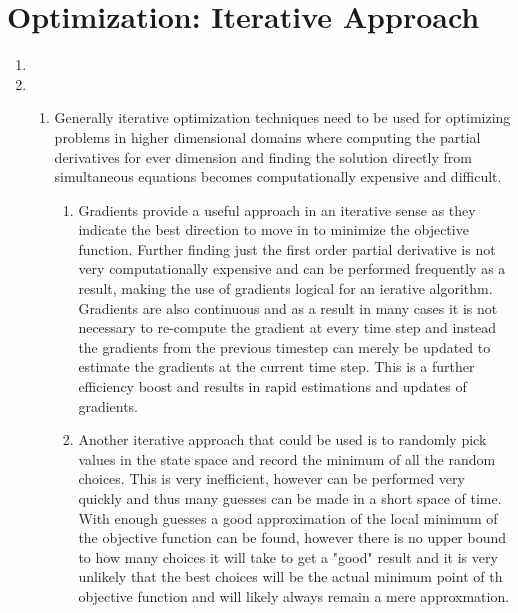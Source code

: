 \documentclass{article}
\begin{document}
\begin{enumerate}
\begin{enumerate}[label=\arabic*)]
\begin{enumerate}[label=\alph*)]
				\end{enumerate}				 				 
		\end{enumerate}
	\end{enumerate}
	\section{Optimization: Iterative Approach}
		\begin{enumerate}
			\item
			\item
			\begin{enumerate}[label=\arabic*)]
				\item
					Generally iterative optimization techniques need to be used for optimizing problems in higher dimensional domains where computing the partial derivatives for ever dimension and finding the solution directly from simultaneous equations becomes computationally expensive and difficult. \\
					\begin{enumerate}[label=\alph*)]
						\item
						Gradients provide a useful approach in an iterative sense as they indicate the best direction to move in to minimize the objective function. Further finding just the first order partial derivative is not very computationally expensive and can be performed frequently as a result, making the use of gradients logical for an ierative algorithm. Gradients are also continuous and as a result in many cases it is not necessary to re-compute the gradient at every time step and instead the gradients from the previous timestep can merely be updated to estimate the gradients at the current time step. This is a further efficiency boost and results in rapid estimations and updates of gradients. \\
						\item
						Another iterative approach that could be used is to randomly pick values in the state space and record the minimum of all the random choices. This is very inefficient, however can be performed very quickly and thus many guesses can be made in a short space of time. With enough guesses a good approximation of the local minimum of the objective function can be found, however there is no upper bound to how many choices it will take to get a "good" result and it is very unlikely that the best choices will be the actual minimum point of th objective function and will likely always remain a mere approxmation. \\
					\end{enumerate}

\end{enumerate}
\end{enumerate}
\end{document}
